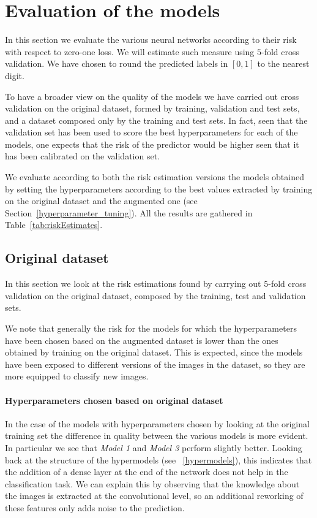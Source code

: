 \section{Evaluation of the models}\label{3_evaluation}
In this section we evaluate the various neural networks according to their risk with respect to zero-one loss. We will estimate such measure using $5$-fold cross validation. We have chosen to round the predicted labels in $\left[0,1\right]$ to the nearest digit.

To have a broader view on the quality of the models we have carried out cross validation on the original dataset, formed by training, validation and test sets, and a dataset composed only by the training and test sets. In fact, seen that the validation set has been used to score the best hyperparameters for each of the models, one expects that the risk of the predictor would be higher seen that it has been calibrated on the validation set. 

We evaluate according to both the risk estimation versions the models obtained by setting the hyperparameters according to the best values extracted by training on the original dataset and the augmented one (see Section~\ref{hyperparameter_tuning}). All the results are gathered in Table~\ref{tab:riskEstimates}.



\subsection{Original dataset}\label{evaluation_originalDataset}
In this section we look at the risk estimations found by carrying out $5$-fold cross validation on the original dataset, composed by the training, test and validation sets. 

We note that generally the risk for the models for which the hyperparameters have been chosen based on the augmented dataset is lower than the ones obtained by training on the original dataset. This is expected, since the models have been exposed to different versions of the images in the dataset, so they are more equipped to classify new images.

\paragraph{Hyperparameters chosen based on original dataset}
In the case of the models with hyperparameters chosen by looking at the original training set the difference in quality between the various models is more evident. In particular we see that \textsl{Model 1} and \textsl{Model 3} perform slightly better. Looking back at the structure of the hypermodels (see ~\ref{hypermodels}), this indicates that the addition of a dense layer at the end of the network does not help in the classification task. We can explain this by observing that the knowledge about the images is extracted at the convolutional level, so an additional reworking of these features only adds noise to the prediction.

